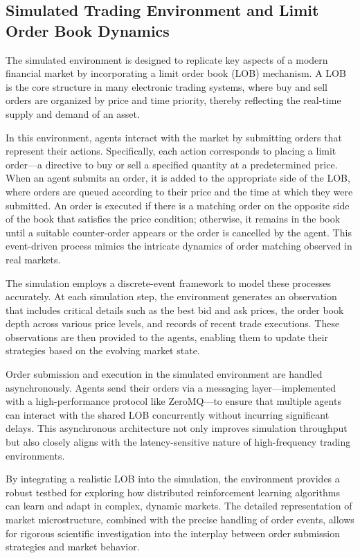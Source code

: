 \documentclass[11pt]{article}
\begin{document}
    \subsection{Simulated Trading Environment and Limit Order Book Dynamics}
    \label{subsec:environment}
    The simulated environment is designed to replicate key aspects of a modern financial market by incorporating a limit order book (LOB) mechanism.
    A LOB is the core structure in many electronic trading systems, where buy and sell orders are organized by price and time priority,
    thereby reflecting the real-time supply and demand of an asset.

    In this environment, agents interact with the market by submitting orders that represent their actions.
    Specifically, each action corresponds to placing a limit order—a directive to buy or sell a specified quantity at a predetermined price.
    When an agent submits an order, it is added to the appropriate side of the LOB, where orders are queued according to their price and
    the time at which they were submitted.
    An order is executed if there is a matching order on the opposite side of the book that satisfies the price condition;
    otherwise, it remains in the book until a suitable counter-order appears or the order is cancelled by the agent.
    This event-driven process mimics the intricate dynamics of order matching observed in real markets.

    The simulation employs a discrete-event framework to model these processes accurately.
    At each simulation step, the environment generates an observation that includes critical details such as the best bid and ask prices,
    the order book depth across various price levels, and records of recent trade executions.
    These observations are then provided to the agents, enabling them to update their strategies based on the evolving market state.

    Order submission and execution in the simulated environment are handled asynchronously.
    Agents send their orders via a messaging layer—implemented with a high-performance protocol like
    ZeroMQ—to ensure that multiple agents can interact with the shared LOB concurrently without incurring significant delays.
    This asynchronous architecture not only improves simulation throughput but also closely aligns with
    the latency-sensitive nature of high-frequency trading environments.

    By integrating a realistic LOB into the simulation, the environment provides a robust testbed for exploring how
    distributed reinforcement learning algorithms can learn and adapt in complex, dynamic markets.
    The detailed representation of market microstructure, combined with the precise handling of order events,
    allows for rigorous scientific investigation into the interplay between order submission strategies and market behavior.
\end{document}
